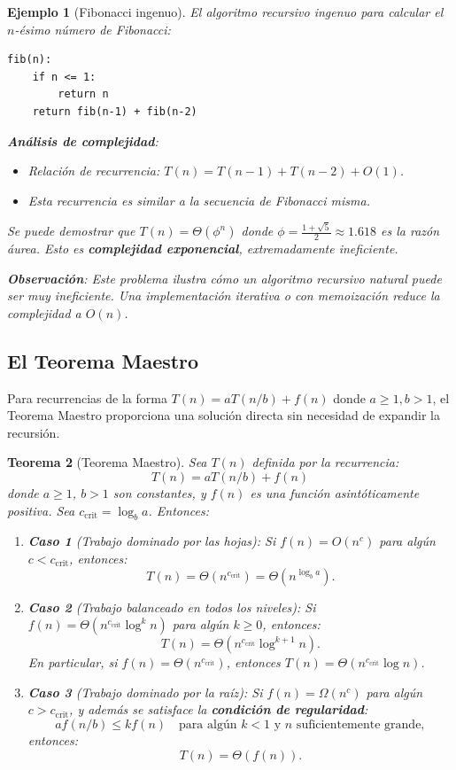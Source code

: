 \documentclass[a4paper,11pt]{report}
\newtheorem{theorem}{Teorema}[chapter]
\newtheorem{example}[theorem]{Ejemplo}
\begin{document}
\begin{example}[Fibonacci ingenuo]
El algoritmo recursivo ingenuo para calcular el $n$-ésimo número de Fibonacci:
\begin{verbatim}
fib(n):
    if n <= 1:
        return n
    return fib(n-1) + fib(n-2)
\end{verbatim}

\textbf{Análisis de complejidad}:
\begin{itemize}
\item Relación de recurrencia: $T(n) = T(n-1) + T(n-2) + O(1)$.
\item Esta recurrencia es similar a la secuencia de Fibonacci misma.
\end{itemize}

Se puede demostrar que $T(n) = \Theta(\phi^n)$ donde $\phi = \frac{1+\sqrt{5}}{2} \approx 1.618$ es la razón áurea. Esto es \textbf{complejidad exponencial}, extremadamente ineficiente.

\textbf{Observación}: Este problema ilustra cómo un algoritmo recursivo natural puede ser muy ineficiente. Una implementación iterativa o con memoización reduce la complejidad a $O(n)$.
\end{example}

\subsection{El Teorema Maestro}

Para recurrencias de la forma $T(n) = aT(n/b) + f(n)$ donde $a \geq 1, b > 1$, el Teorema Maestro proporciona una solución directa sin necesidad de expandir la recursión.

\begin{theorem}[Teorema Maestro]\label{thm:master}
Sea $T(n)$ definida por la recurrencia:
\[
T(n) = aT(n/b) + f(n)
\]
donde $a \geq 1$, $b > 1$ son constantes, y $f(n)$ es una función asintóticamente positiva. Sea $c_{\text{crit}} = \log_b a$. Entonces:

\begin{enumerate}
\item \textbf{Caso 1} (Trabajo dominado por las hojas): Si $f(n) = O(n^c)$ para algún $c < c_{\text{crit}}$, entonces:
\[
T(n) = \Theta(n^{c_{\text{crit}}}) = \Theta(n^{\log_b a}).
\]

\item \textbf{Caso 2} (Trabajo balanceado en todos los niveles): Si $f(n) = \Theta(n^{c_{\text{crit}}} \log^k n)$ para algún $k \geq 0$, entonces:
\[
T(n) = \Theta(n^{c_{\text{crit}}} \log^{k+1} n).
\]
En particular, si $f(n) = \Theta(n^{c_{\text{crit}}})$, entonces $T(n) = \Theta(n^{c_{\text{crit}}} \log n)$.

\item \textbf{Caso 3} (Trabajo dominado por la raíz): Si $f(n) = \Omega(n^c)$ para algún $c > c_{\text{crit}}$, y además se satisface la \textbf{condición de regularidad}:
\[
a f(n/b) \leq k f(n) \quad \text{para algún } k < 1 \text{ y } n \text{ suficientemente grande},
\]
entonces:
\[
T(n) = \Theta(f(n)).
\]
\end{enumerate}
\end{theorem}
\end{document}
